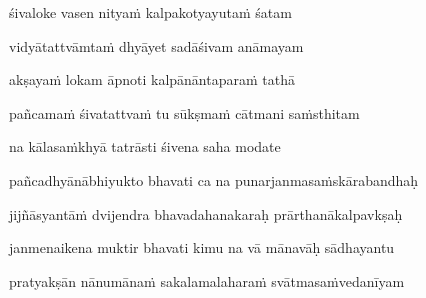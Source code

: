 śivaloke vasen nitya\.m kalpakotyayuta\.m śatam \veg\dontdisplaylinenum

vidyātattvāmta\.m dhyāyet sadāśivam anāmayam\thinspace{\dandab} \dontdisplaylinenum

akṣaya\.m lokam āpnoti kalpānāntapara\.m tathā \veg\dontdisplaylinenum 

pañcama\.m śivatattva\.m tu sūkṣma\.m cātmani sa\.msthitam\thinspace{\dandab} \dontdisplaylinenum

na kālasa\.mkhyā tatrāsti śivena saha modate \veg\dontdisplaylinenum

\ujvers\nemsloka 
pañcadhyānābhiyukto bhavati ca na punarjanmasa\.mskārabandhaḥ
\dontdisplaylinenum

\nemslokab 
jijñāsyantā\.m dvijendra bhavadahanakaraḥ prārthanākalpavkṣaḥ \danda\dontdisplaylinenum

\nemslokac 
janmenaikena muktir bhavati kimu na vā mānavāḥ sādhayantu
\dontdisplaylinenum

\nemslokad 
pratyakṣān nānumāna\.m sakalamalahara\.m svātmasa\.mvedanīyam \veg\dontdisplaylinenum

\vers


